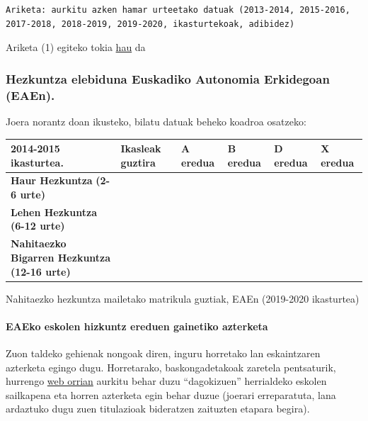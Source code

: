 \documentclass[
]{book}
\begin{document}
\begin{verbatim}
Ariketa: aurkitu azken hamar urteetako datuak (2013-2014, 2015-2016, 2017-2018, 2018-2019, 2019-2020, ikasturtekoak, adibidez)
\end{verbatim}

Ariketa (1) egiteko tokia \href{https://ethercalc.net/dryssi08679b}{hau} da

\hypertarget{hezkuntza-elebiduna-euskadiko-autonomia-erkidegoan-eaen.-1}{%
\subsubsection*{Hezkuntza elebiduna Euskadiko Autonomia Erkidegoan (EAEn).}\label{hezkuntza-elebiduna-euskadiko-autonomia-erkidegoan-eaen.-1}}

Joera norantz doan ikusteko, bilatu datuak beheko koadroa osatzeko:

\begin{longtable}[]{@{}llllll@{}}
\toprule
\textbf{2014-2015 ikasturtea.} & \textbf{Ikasleak guztira} & \textbf{A eredua} & \textbf{B eredua} & \textbf{D eredua} & \textbf{X eredua} \\
\midrule
\endhead
\textbf{Haur Hezkuntza} \textbf{(2-6 urte)} & & & & & \\
\textbf{Lehen Hezkuntza} \textbf{(6-12 urte)} & & & & & \\
\textbf{Nahitaezko Bigarren Hezkuntza (12-16 urte)} & & & & & \\
\bottomrule
\end{longtable}

Nahitaezko hezkuntza mailetako matrikula guztiak, EAEn (2019-2020 ikasturtea)

\hypertarget{eaeko-eskolen-hizkuntz-ereduen-gainetiko-azterketa}{%
\paragraph*{EAEko eskolen hizkuntz ereduen gainetiko azterketa}\label{eaeko-eskolen-hizkuntz-ereduen-gainetiko-azterketa}}

Zuon taldeko gehienak nongoak diren, inguru horretako lan eskaintzaren azterketa egingo dugu. Horretarako, baskongadetakoak zaretela pentsaturik, hurrengo \href{https://www.euskadi.eus/onarpena-haur-lehen-eta-derrigorrezko-bigarren-hezkuntza/web01-a2hikast/eu/}{web orrian} aurkitu behar duzu ``dagokizuen'' herrialdeko eskolen sailkapena eta horren azterketa egin behar duzue (joerari erreparatuta, lana ardaztuko dugu zuen titulazioak bideratzen zaituzten etapara begira).
\end{document}
